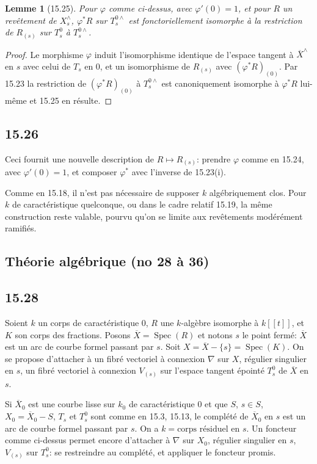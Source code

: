 \documentclass[12pt,a4paper]{article}
\theoremstyle{plain}
\newtheorem{lemma}[theorem]{Lemme}
\theoremstyle{definition}
\theoremstyle{remark}
\DeclareMathOperator{\Spec}{Spec}
\begin{document}
\begin{lemma}[15.25]
Pour $\varphi$ comme ci-dessus, avec $\varphi'(0) = 1$, et pour $R$ un revêtement de $X_s^\wedge$, $\varphi^* R$ sur $T_s^{0\wedge}$ est fonctoriellement isomorphe à la restriction de $R_{(s)}$ sur $T_s^0$ à $T_s^{0\wedge}$.
\end{lemma}

\begin{proof}
Le morphisme $\varphi$ induit l'isomorphisme identique de l'espace tangent à $\overline{X}^\wedge$ en $s$ avec celui de $T_s$ en $0$, et un isomorphisme de $R_{(s)}$ avec $(\varphi^* R)_{(0)}$. Par 15.23 la restriction de $(\varphi^* R)_{(0)}$ à $T_s^{0\wedge}$ est canoniquement isomorphe à $\varphi^* R$ lui-même et 15.25 en résulte.
\end{proof}

\subsection*{15.26}

Ceci fournit une nouvelle description de $R \mapsto R_{(s)}$: prendre $\varphi$ comme en 15.24, avec $\varphi'(0) = 1$, et composer $\varphi^*$ avec l'inverse de 15.23(i).

Comme en 15.18, il n'est pas nécessaire de supposer $k$ algébriquement clos. Pour $k$ de caractéristique quelconque, ou dans le cadre relatif 15.19, la même construction reste valable, pourvu qu'on se limite aux revêtements modérément ramifiés.


\subsection*{Théorie algébrique (no 28 à 36)}

\subsection*{15.28}

Soient $k$ un corps de caractéristique $0$, $R$ une $k$-algèbre isomorphe à $k[[t]]$, et $K$ son corps des fractions. Posons $\overline{X} = \Spec(R)$ et notons $s$ le point fermé: $\overline{X}$ est un arc de courbe formel passant par $s$. Soit $X = \overline{X} - \{s\} = \Spec(K)$. On se propose d'attacher à un fibré vectoriel à connexion $\nabla$ sur $X$, régulier singulier en $s$, un fibré vectoriel à connexion $V_{(s)}$ sur l'espace tangent épointé $T_s^0$ de $\overline{X}$ en $s$.

Si $\overline{X}_0$ est une courbe lisse sur $k_0$ de caractéristique $0$ et que $S$, $s \in S$, $X_0 = \overline{X}_0 - S$, $T_s$ et $T_s^0$ sont comme en 15.3, 15.13, le complété de $\overline{X}_0$ en $s$ est un arc de courbe formel passant par $s$. On a $k = \text{corps résiduel en } s$. Un foncteur comme ci-dessus permet encore d'attacher à $\nabla$ sur $X_0$, régulier singulier en $s$, $V_{(s)}$ sur $T_s^0$: se restreindre au complété, et appliquer le foncteur promis.
\end{document}
